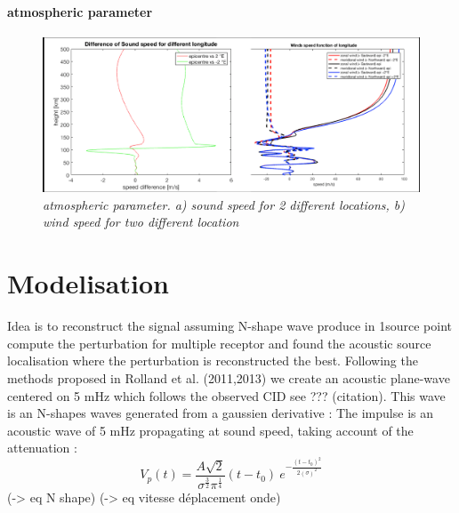 \documentclass{gji}
\begin{document}
\paragraph{atmospheric parameter}
\begin{figure}
\begin{center}
\includegraphics[width=1\linewidth]{images/sound_wind_epiVS2deg.png}
\end{center}
\caption{ \textit{\emph{atmospheric parameter}. a) sound speed for 2 different locations, b) wind speed for two different location }} 

\label{atmos_param}
\end{figure}


\section{Modelisation} 
        Idea is to reconstruct the signal assuming N-shape wave produce in 1source point compute the perturbation for multiple receptor and found the acoustic source localisation where the perturbation is reconstructed the best. Following the methods proposed in Rolland et al. (2011,2013) we create an acoustic plane-wave centered on 5 mHz which follows the observed CID see ??? (citation). This wave is an N-shapes waves generated from a gaussien derivative : 
      The impulse is an acoustic wave of 5 mHz propagating at sound speed, taking account of the attenuation 
      :\begin{equation}\label{fct_source}
V_p(t) = \frac{A\sqrt{2}}{\sigma^{\frac{3}{2}}\pi^{\frac{1}{4}}} (t-t_0) \ e^{-\frac{(t-t_0)^{2}}{2(\sigma)^{2}}} 
\end{equation}
        (-> eq N shape)
        (-> eq vitesse déplacement onde)
        
\end{document}
